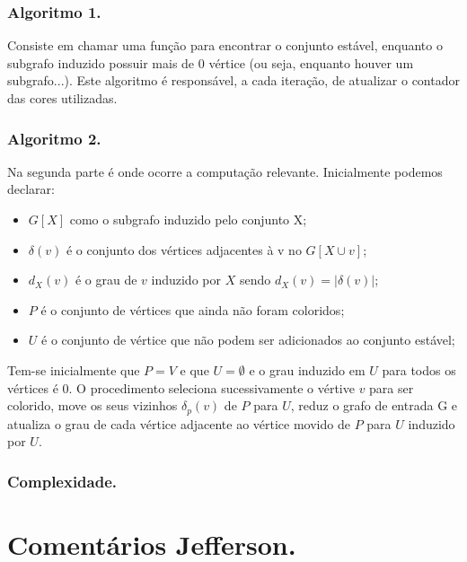\documentclass[a4paper,12pt]{article}
\begin{document}
\subsubsection{Algoritmo 1.}

Consiste em chamar uma função para encontrar o conjunto estável, enquanto o subgrafo induzido possuir mais de 0 vértice (ou seja, enquanto houver um subgrafo...). Este algoritmo é responsável, a cada iteração, de atualizar o contador das cores utilizadas.

\subsubsection{Algoritmo 2.}

Na segunda parte é onde ocorre a computação relevante. Inicialmente podemos declarar:

\begin{itemize}
\item $G[X]$ como o subgrafo induzido pelo conjunto X;
\item $\delta (v)$ é o conjunto dos vértices adjacentes à v no $G[X \cup v]$;
\item $d_X(v)$ é o grau de $v$ induzido por $X$ sendo $d_X(v) = |\delta (v)|$;
\item $P$ é o conjunto de vértices que ainda não foram coloridos;
\item $U$ é o conjunto de vértice que não podem ser adicionados ao conjunto estável;
\end{itemize}

Tem-se inicialmente que $P = V$ e que $U = \emptyset$ e o grau induzido em $U$ para todos os vértices é 0. O procedimento seleciona sucessivamente o vértive $v$ para ser colorido, move os seus vizinhos $\delta_p (v)$ de $P$ para $U$, reduz o grafo de entrada G e atualiza o grau de cada vértice adjacente ao vértice movido de $P$ para $U$ induzido por $U$.

\subsubsection{Complexidade.}


\section{Comentários Jefferson.}
\end{document}
